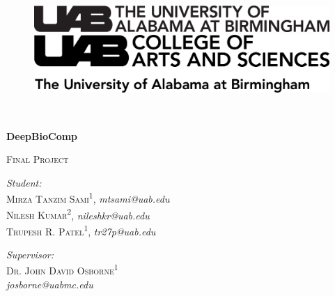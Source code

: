 \begin{titlepage}
	\begin{figure}[t]
		\begin{minipage}{0.55\textwidth}
			\begin{flushleft}
				\includegraphics[scale=0.7]{Images/black-without-R-core-standard.png}
			\end{flushleft}
		\end{minipage}
		\hfill
		\begin{minipage}{0.44\textwidth}
			\begin{flushright}
				\includegraphics[scale=0.5]{Images/black-without-R-standard.png}
			\end{flushright}
		\end{minipage}
	\end{figure}
	
	\quad\\
	\center
	\begin{spacing}{2.0}
		{{ \textbf{\LARGE DeepBioComp}}}
	\end{spacing}
	
	\vspace{2in}
	\textsc{ {\Large Final Project}} 
	\vspace{3in}

	\begin{minipage}{0.49\textwidth}
		\begin{flushleft}
			\textit{Student:} \\
			\textsc{Mirza Tanzim Sami\textsuperscript{1}}, \textsl{mtsami@uab.edu}\\
			\textsc{Nilesh Kumar\textsuperscript{2}}, \textsl{nileshkr@uab.edu}\\
			\textsc{Trupesh R. Patel\textsuperscript{1}}, \textsl{tr27p@uab.edu}
		\end{flushleft}
	\end{minipage}
	\begin{minipage}{0.5\textwidth}
		\begin{flushright}
			\textit{Supervisor:} \\
			\textsc{Dr. John David Osborne\textsuperscript{1}}\\
			\textsl{josborne@uabmc.edu}
		\end{flushright}
	\end{minipage}


\end{titlepage}
